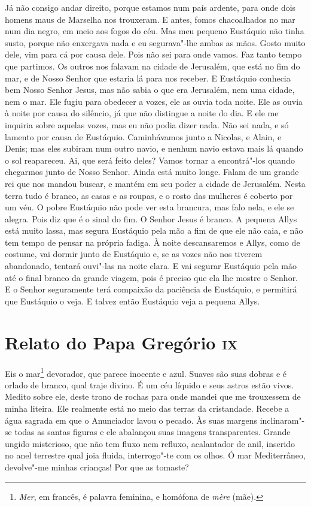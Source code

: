 Já não consigo andar direito, porque estamos num país ardente, para onde
dois homens maus de Marselha nos trouxeram. E antes, fomos chacoalhados no
mar num dia negro, em meio aos fogos do céu. Mas meu pequeno Eustáquio não
tinha susto, porque não enxergava nada e eu segurava"-lhe ambas as mãos.
Gosto muito dele, vim para cá por causa dele. Pois não sei para onde
vamos. Faz tanto tempo que partimos. Os outros nos falavam na cidade de
Jerusalém, que está no fim do mar, e de Nosso Senhor que estaria lá para
nos receber. E Eustáquio conhecia bem Nosso Senhor Jesus, mas não sabia o
que era Jerusalém, nem uma cidade, nem o mar. Ele fugiu para obedecer a
vozes, ele as ouvia toda noite. Ele as ouvia à noite por causa do
silêncio, já que não distingue a noite do dia. E ele me inquiria sobre
aquelas vozes, mas eu não podia dizer nada. Não sei nada, e só lamento por
causa de Eustáquio. Caminhávamos junto a Nicolas, e Alain, e Denis; mas
eles subiram num outro navio, e nenhum navio estava mais lá quando o sol
reapareceu. Ai, que será feito deles? Vamos tornar a encontrá"-los quando
chegarmos junto de Nosso Senhor. Ainda está muito longe. Falam de um
grande rei que nos mandou buscar, e mantém em seu poder a cidade de
Jerusalém. Nesta terra tudo é branco, as casas e as roupas, e o rosto das
mulheres é coberto por um véu. O pobre Eustáquio não pode ver esta
brancura, mas falo nela, e ele se alegra. Pois diz que é o sinal do fim. O
Senhor Jesus é branco. A pequena Allys está muito lassa, mas segura
Eustáquio pela mão a fim de que ele não caia, e não tem tempo de pensar na
própria fadiga. À noite descansaremos e Allys, como de costume, vai dormir
junto de Eustáquio e, se as vozes não nos tiverem abandonado, tentará
ouvi"-las na noite clara. E vai segurar Eustáquio pela mão até o final
branco da grande viagem, pois é preciso que ela lhe mostre o Senhor. E o
Senhor seguramente terá compaixão da paciência de Eustáquio, e permitirá
que Eustáquio o veja. E talvez então Eustáquio veja a pequena Allys.

\chapter{Relato do Papa Gregório \textsc{ix}}

Eis o mar\footnote{ \textit{Mer}, em francês, é palavra feminina, e
homófona de \textit{mère} (mãe).} devorador, que parece inocente e azul.
Suaves são suas dobras e é orlado de branco, qual traje divino. É um céu
líquido e seus astros estão vivos. Medito sobre ele, deste trono de rochas
para onde mandei que me trouxessem de minha liteira. Ele realmente está no
meio das terras da cristandade. Recebe a água sagrada em que o Anunciador
lavou o pecado. Às suas margens inclinaram"-se todas as santas figuras e
ele abalançou suas imagens transparentes. Grande ungido misterioso, que
não tem fluxo nem refluxo, acalantador de anil, inserido no anel terrestre
qual joia fluida, interrogo"-te com os olhos. Ó mar Mediterrâneo,
devolve"-me minhas crianças! Por que as tomaste?

